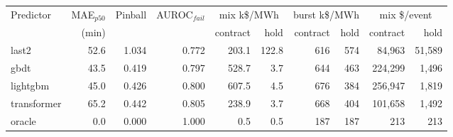 \begin{tabular}{lrrrrrrrrr}
\toprule
Predictor & MAE$_{p50}$ & Pinball & AUROC$_{fail}$ & \multicolumn{2}{c}{mix k\$/MWh} & \multicolumn{2}{c}{burst k\$/MWh} & \multicolumn{2}{c}{mix \$/event} \\
 & (min) & & & contract & hold & contract & hold & contract & hold \\
\midrule
last2 & 52.6 & 1.034 & 0.772 & 203.1 & 122.8 & 616 & 574 & 84{,}963 & 51{,}589 \\
gbdt & 43.5 & 0.419 & 0.797 & 528.7 & 3.7 & 644 & 463 & 224{,}299 & 1{,}496 \\
lightgbm & 45.0 & 0.426 & 0.800 & 607.5 & 4.5 & 676 & 384 & 256{,}947 & 1{,}819 \\
transformer & 65.2 & 0.442 & 0.805 & 238.9 & 3.7 & 668 & 404 & 101{,}658 & 1{,}492 \\
oracle & 0.0 & 0.000 & 1.000 & 0.5 & 0.5 & 187 & 187 & 213 & 213 \\
\bottomrule
\end{tabular}
